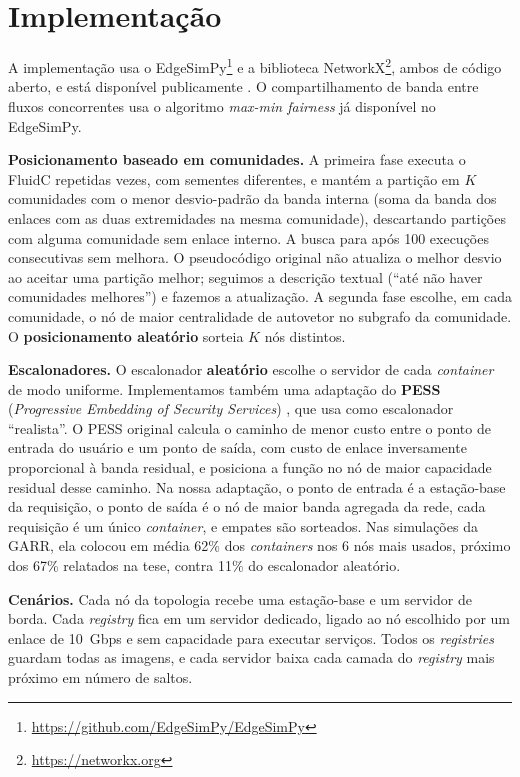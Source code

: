 \documentclass[12pt]{article}
\begin{document}
\section{Implementação}
\label{sec:implementacao}

A implementação usa o EdgeSimPy\footnote{\url{https://github.com/EdgeSimPy/EdgeSimPy}}
\cite{souza2023} e a biblioteca NetworkX\footnote{\url{https://networkx.org}},
ambos de código aberto, e está disponível publicamente \cite{repositorio}. O compartilhamento de banda entre fluxos concorrentes usa o
algoritmo \textit{max-min fairness} já disponível no EdgeSimPy.

\textbf{Posicionamento baseado em comunidades.} A primeira fase executa o FluidC
repetidas vezes, com sementes diferentes, e mantém a partição em $K$ comunidades
com o menor desvio-padrão da banda interna (soma da banda dos enlaces com as duas
extremidades na mesma comunidade), descartando partições com alguma comunidade
sem enlace interno. A busca para após 100 execuções consecutivas sem melhora. O
pseudocódigo original não atualiza o melhor desvio ao aceitar uma partição
melhor; seguimos a descrição textual (``até não haver comunidades melhores'') e
fazemos a atualização. A segunda fase escolhe, em cada comunidade, o nó de maior
centralidade de autovetor no subgrafo da comunidade. O \textbf{posicionamento
aleatório} sorteia $K$ nós distintos.

\textbf{Escalonadores.} O escalonador \textbf{aleatório} escolhe o servidor de
cada \textit{container} de modo uniforme. Implementamos também uma adaptação do
\textbf{PESS} (\textit{Progressive Embedding of Security Services})
\cite{doriguzzi2020}, que \cite{knob2022} usa como escalonador ``realista''. O
PESS original calcula o caminho de menor custo entre o ponto de entrada do usuário
e um ponto de saída, com custo de enlace inversamente proporcional à banda
residual, e posiciona a função no nó de maior capacidade residual desse caminho.
Na nossa adaptação, o ponto de entrada é a estação-base da requisição, o ponto de
saída é o nó de maior banda agregada da rede, cada requisição é um único
\textit{container}, e empates são sorteados. Nas simulações da GARR, ela colocou
em média 62\% dos \textit{containers} nos 6 nós mais usados, próximo dos 67\%
relatados na tese, contra 11\% do escalonador aleatório.

\textbf{Cenários.} Cada nó da topologia recebe uma estação-base e um servidor de
borda. Cada \textit{registry} fica em um servidor dedicado, ligado ao nó escolhido
por um enlace de 10~Gbps e sem capacidade para executar serviços. Todos os
\textit{registries} guardam todas as imagens, e cada servidor baixa cada camada do
\textit{registry} mais próximo em número de saltos.
\end{document}
